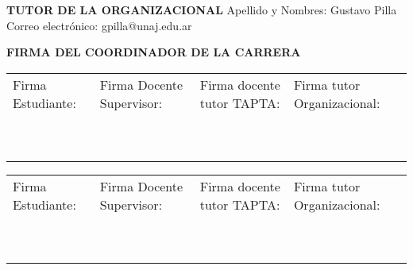 \documentclass[12pt]{article}
\begin{document}
\begin{framed}
\noindent\textbf{TUTOR DE LA ORGANIZACIONAL}\newline
Apellido y Nombres: Gustavo Pilla \newline
Correo electr\'{o}nico: gpilla@unaj.edu.ar
\end{framed}

\begin{framed}
    \noindent\textbf{FIRMA DEL COORDINADOR DE LA CARRERA}
\end{framed}
\vfill
\noindent\begin{tabular}{|P{3.3cm}|P{3.3cm}|P{3.3cm}|P{3.3cm}|}
\hline
Firma Estudiante: & Firma Docente Supervisor: & Firma docente tutor TAPTA: & Firma tutor Organizacional: \\
~ & ~ & ~ & ~ \\
~ & ~ & ~ & ~ \\
\hline
\end{tabular}
\newpage




\vfill
\noindent\begin{tabular}{|P{3.3cm}|P{3.3cm}|P{3.3cm}|P{3.3cm}|}
\hline
Firma Estudiante: & Firma Docente Supervisor: & Firma docente tutor TAPTA: & Firma tutor Organizacional: \\
~ & ~ & ~ & ~ \\
~ & ~ & ~ & ~ \\
\hline
\end{tabular}
\end{document}
